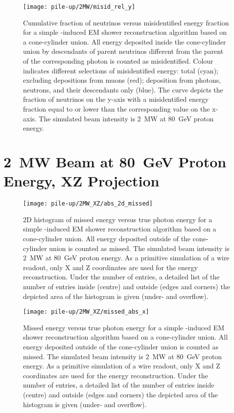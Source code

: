 \begin{figure}[htb]
	\centering
	\texttt{[image: pile-up/2MW/misid\_rel\_y]}
	\caption{Cumulative fraction of neutrinos versus misidentified energy fraction for a simple \Pgpz-induced EM shower reconstruction algorithm based on a cone-cylinder union.
		All energy deposited inside the cone-cylinder union by descendants of parent neutrinos different from the parent of the corresponding \Pgpz photon is counted as misidentified.
		Colour indicates different selections of misidentified energy: total (cyan); excluding depositions from muons (red); deposition from photons, neutrons, and their descendants only (blue).
		The curve depicts the fraction of neutrinos on the y-axis with a misidentified energy fraction equal to or lower than the corresponding value on the x-axis.
		The simulated beam intensity is \SI{2}{\mega\watt} at \SI{80}{\giga\electronvolt} proton energy.}
\end{figure}

\clearpage


\section{\SI{2}{\mega\watt} Beam at \SI{80}{\giga\electronvolt} Proton Energy, XZ Projection}

\begin{figure}[htb]
	\centering
	\texttt{[image: pile-up/2MW\_XZ/abs\_2d\_missed]}
	\caption{2D histogram of missed energy versus true photon energy for a simple \Pgpz-induced EM shower reconstruction algorithm based on a cone-cylinder union.
		All energy deposited outside of the cone-cylinder union is counted as missed.
		The simulated beam intensity is \SI{2}{\mega\watt} at \SI{80}{\giga\electronvolt} proton energy.
		As a primitive simulation of a wire readout, only X and Z coordinates are used for the energy reconstruction.
		Under the number of entries, a detailed list of the number of entries inside (centre) and outside (edges and corners) the depicted area of the histogram is given (under- and overflow).}
\end{figure}

\begin{figure}[htb]
	\centering
	\texttt{[image: pile-up/2MW\_XZ/missed\_abs\_x]}
	\caption{Missed energy versus true photon energy for a simple \Pgpz-induced EM shower reconstruction algorithm based on a cone-cylinder union.
		All energy deposited outside of the cone-cylinder union is counted as missed.
		The simulated beam intensity is \SI{2}{\mega\watt} at \SI{80}{\giga\electronvolt} proton energy.
		As a primitive simulation of a wire readout, only X and Z coordinates are used for the energy reconstruction.
		Under the number of entries, a detailed list of the number of entries inside (centre) and outside (edges and corners) the depicted area of the histogram is given (under- and overflow).}
\end{figure}

